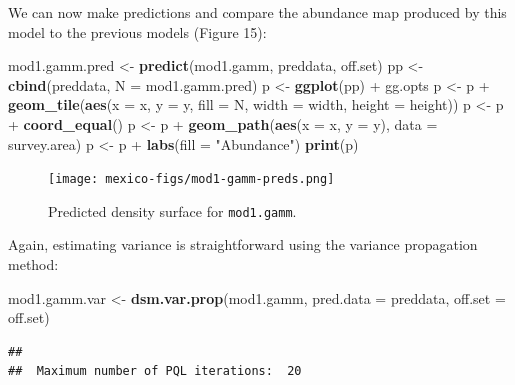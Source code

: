 \documentclass[]{article}
\newenvironment{Shaded}{}{}
\newcommand{\KeywordTok}[1]{\textcolor[rgb]{0.00,0.44,0.13}{\textbf{{#1}}}}
\newcommand{\DataTypeTok}[1]{\textcolor[rgb]{0.56,0.13,0.00}{{#1}}}
\newcommand{\StringTok}[1]{\textcolor[rgb]{0.25,0.44,0.63}{{#1}}}
\newcommand{\NormalTok}[1]{{#1}}
\begin{document}
We can now make predictions and compare the abundance map produced by
this model to the previous models (Figure 15):

\begin{Shaded}
\begin{Highlighting}[]
\NormalTok{mod1.gamm.pred <-}\StringTok{ }\KeywordTok{predict}\NormalTok{(mod1.gamm, preddata, off.set)}
\NormalTok{pp <-}\StringTok{ }\KeywordTok{cbind}\NormalTok{(preddata, }\DataTypeTok{N =} \NormalTok{mod1.gamm.pred)}
\NormalTok{p <-}\StringTok{ }\KeywordTok{ggplot}\NormalTok{(pp) +}\StringTok{ }\NormalTok{gg.opts}
\NormalTok{p <-}\StringTok{ }\NormalTok{p +}\StringTok{ }\KeywordTok{geom_tile}\NormalTok{(}\KeywordTok{aes}\NormalTok{(}\DataTypeTok{x =} \NormalTok{x, }\DataTypeTok{y =} \NormalTok{y, }\DataTypeTok{fill =} \NormalTok{N, }\DataTypeTok{width =} \NormalTok{width, }\DataTypeTok{height =} \NormalTok{height))}
\NormalTok{p <-}\StringTok{ }\NormalTok{p +}\StringTok{ }\KeywordTok{coord_equal}\NormalTok{()}
\NormalTok{p <-}\StringTok{ }\NormalTok{p +}\StringTok{ }\KeywordTok{geom_path}\NormalTok{(}\KeywordTok{aes}\NormalTok{(}\DataTypeTok{x =} \NormalTok{x, }\DataTypeTok{y =} \NormalTok{y), }\DataTypeTok{data =} \NormalTok{survey.area)}
\NormalTok{p <-}\StringTok{ }\NormalTok{p +}\StringTok{ }\KeywordTok{labs}\NormalTok{(}\DataTypeTok{fill =} \StringTok{"Abundance"}\NormalTok{)}
\KeywordTok{print}\NormalTok{(p)}
\end{Highlighting}
\end{Shaded}

\begin{figure}[htbp]
\centering
\texttt{[image: mexico-figs/mod1-gamm-preds.png]}
\caption{Predicted density surface for \texttt{mod1.gamm}.}
\end{figure}

Again, estimating variance is straightforward using the variance
propagation method:

\begin{Shaded}
\begin{Highlighting}[]
\NormalTok{mod1.gamm.var <-}\StringTok{ }\KeywordTok{dsm.var.prop}\NormalTok{(mod1.gamm, }\DataTypeTok{pred.data =} \NormalTok{preddata, }\DataTypeTok{off.set =} \NormalTok{off.set)}
\end{Highlighting}
\end{Shaded}

\begin{verbatim}
## 
##  Maximum number of PQL iterations:  20
\end{verbatim}
\end{document}
